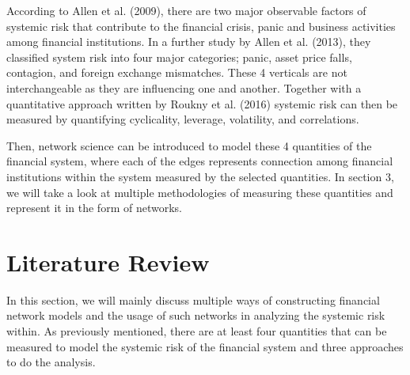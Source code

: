 \documentclass[a4paper,11pt]{article}
\begin{document}
According to Allen et al. (2009), there are two major observable factors of systemic risk that contribute to the financial crisis, panic and business activities among financial institutions. In a further study by Allen et al. (2013), they classified system risk into four major categories; panic, asset price falls, contagion, and foreign exchange mismatches. These 4 verticals are not interchangeable as they are influencing one and another. Together with a quantitative approach written by Roukny et al. (2016) systemic risk can then be measured by quantifying cyclicality, leverage, volatility, and correlations.

Then, network science can be introduced to model these 4 quantities of the financial system, where each of the edges represents connection among financial institutions within the system measured by the selected quantities. In section 3, we will take a look at multiple methodologies of measuring these quantities and represent it in the form of networks.

\section{Literature Review}
In this section, we will mainly discuss multiple ways of constructing financial network models and the usage of such networks in analyzing the systemic risk within. As previously mentioned, there are at least four quantities that can be measured to model the systemic risk of the financial system and three approaches to do the analysis.
\end{document}
